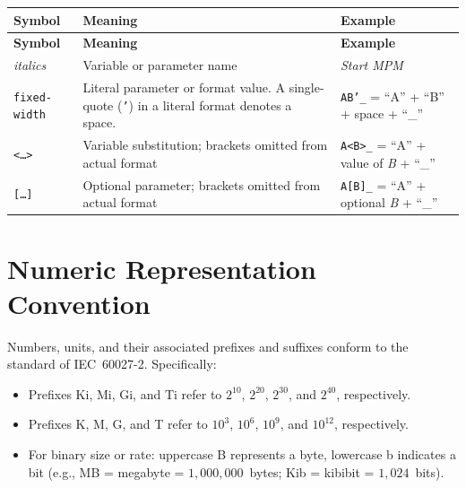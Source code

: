 \begin{longtable}{l p{4.5cm} p{6cm}}
\toprule
\textbf{Symbol} & \textbf{Meaning} & \textbf{Example} \\
\midrule
\endfirsthead

\toprule
\textbf{Symbol} & \textbf{Meaning} & \textbf{Example} \\
\midrule
\endhead

\bottomrule
\endfoot

\textit{italics}
    & Variable or parameter name
    & \textit{Start MPM} \\[4pt]

\texttt{fixed-width}
    & Literal parameter or format value.
      A single-quote (\texttt{'}) in a
      literal format denotes a space.
    & \texttt{AB'\_} = ``A'' + ``B'' + space + ``\_'' \\[4pt]

\texttt{<\ldots>}
    & Variable substitution; brackets
      omitted from actual format
    & \texttt{A<B>\_} = ``A'' + value of \textit{B} + ``\_'' \\[4pt]

\texttt{[\ldots]}
    & Optional parameter; brackets
      omitted from actual format
    & \texttt{A[B]\_} = ``A'' + optional \textit{B} + ``\_'' \\

\end{longtable}

\section{Numeric Representation Convention}

Numbers, units, and their associated prefixes and suffixes conform to the
standard of IEC~60027-2.  Specifically:

\begin{itemize}
    \item Prefixes Ki, Mi, Gi, and Ti refer to $2^{10}$, $2^{20}$, $2^{30}$,
          and $2^{40}$, respectively.
    \item Prefixes K, M, G, and T refer to $10^{3}$, $10^{6}$, $10^{9}$,
          and $10^{12}$, respectively.
    \item For binary size or rate: uppercase B represents a byte, lowercase b
          indicates a bit (e.g., MB = megabyte = $1{,}000{,}000$~bytes;
          Kib = kibibit = $1{,}024$~bits).
\end{itemize}

